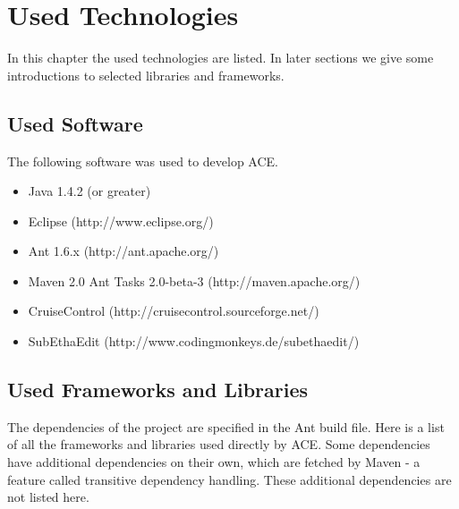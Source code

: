 \chapter{Used Technologies}

In this chapter the used technologies are listed. In later sections we give
some introductions to selected libraries and frameworks.


\section{Used Software}
The following software was used to develop ACE.
\begin{itemize}
 \item Java 1.4.2 (or greater)
 \item Eclipse (http://www.eclipse.org/)
 \item Ant 1.6.x (http://ant.apache.org/)
 \item Maven 2.0 Ant Tasks 2.0-beta-3 (http://maven.apache.org/)
 \item CruiseControl (http://cruisecontrol.sourceforge.net/)
 \item SubEthaEdit (http://www.codingmonkeys.de/subethaedit/)
\end{itemize}


\section{Used Frameworks and Libraries}
The dependencies of the project are specified in the Ant build file.
Here is a list of all the frameworks and libraries used directly by ACE. 
Some dependencies have additional dependencies on their own, which are 
fetched by Maven - a feature called transitive dependency handling. These
additional dependencies are not listed here.

